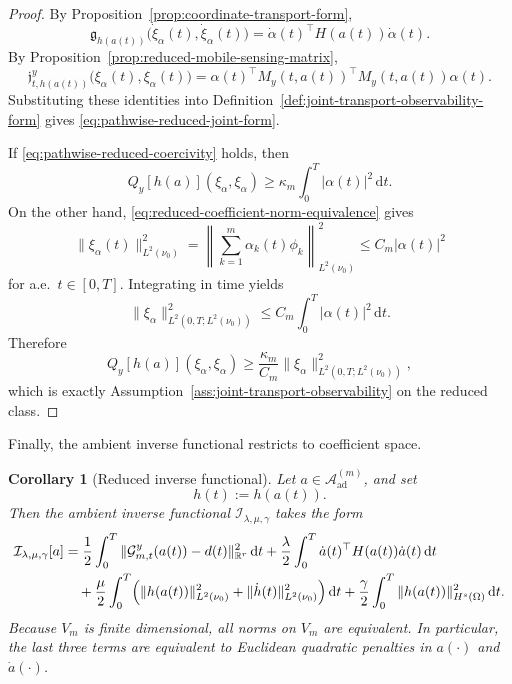 \documentclass{article}
\newtheorem{corollary}[theorem]{Corollary}
\theoremstyle{definition}
\renewcommand{\d}{\mathrm{d}}
\begin{document}
\begin{proof}
    By Proposition~\ref{prop:coordinate-transport-form},
    \[
        \mathfrak g_{h(a(t))}\bigl(\dot\xi_\alpha(t),\dot\xi_\alpha(t)\bigr)
        =
        \dot\alpha(t)^\top H(a(t))\dot\alpha(t).
    \]
    By Proposition~\ref{prop:reduced-mobile-sensing-matrix},
    \[
        \mathfrak j_{t,h(a(t))}^{y}\bigl(\xi_\alpha(t),\xi_\alpha(t)\bigr)
        =
        \alpha(t)^\top M_y(t,a(t))^\top M_y(t,a(t))\alpha(t).
    \]
    Substituting these identities into Definition~\ref{def:joint-transport-observability-form} gives
    \eqref{eq:pathwise-reduced-joint-form}.

    If \eqref{eq:pathwise-reduced-coercivity} holds, then
    \[
        Q_y[h(a)](\xi_\alpha,\xi_\alpha)
        \ge
        \kappa_m \int_0^T |\alpha(t)|^2\,\d t.
    \]
    On the other hand, \eqref{eq:reduced-coefficient-norm-equivalence} gives
    \[
        \|\xi_\alpha(t)\|_{L^2(\nu_0)}^2
        =
        \left\|\sum_{k=1}^m \alpha_k(t)\phi_k\right\|_{L^2(\nu_0)}^2
        \le
        C_m |\alpha(t)|^2
    \]
    for a.e.\ \(t\in[0,T]\). Integrating in time yields
    \[
        \|\xi_\alpha\|_{L^2(0,T;L^2(\nu_0))}^2
        \le
        C_m \int_0^T |\alpha(t)|^2\,\d t.
    \]
    Therefore
    \[
        Q_y[h(a)](\xi_\alpha,\xi_\alpha)
        \ge
        \frac{\kappa_m}{C_m}
        \|\xi_\alpha\|_{L^2(0,T;L^2(\nu_0))}^2,
    \]
    which is exactly Assumption~\ref{ass:joint-transport-observability} on the reduced class.
\end{proof}

Finally, the ambient inverse functional restricts to coefficient space.

\begin{corollary}[Reduced inverse functional]
    \label{cor:finite-dimensional-inverse-problem}
    Let \(a\in \mathcal A_{\mathrm{ad}}^{(m)}\), and set
    \[
        h(t):=h(a(t)).
    \]
    Then the ambient inverse functional \(\mathcal I_{\lambda,\mu,\gamma}\) takes the form
    \begin{align}
        \label{eq:reduced-inverse-functional}
        \mathcal I_{\lambda,\mu,\gamma}[a]
         & =
        \frac12\int_0^T \|\mathcal G_{m,t}^{y}(a(t))-d(t)\|_{\mathbb R^r}^2\,\d t
        +
        \frac{\lambda}{2}\int_0^T \dot a(t)^\top H(a(t))\dot a(t)\,\d t \notag \\
         & \quad
        +
        \frac{\mu}{2}\int_0^T
        \Bigl(
        \|h(a(t))\|_{L^2(\nu_0)}^2
        +
        \|\dot h(t)\|_{L^2(\nu_0)}^2
        \Bigr)\,\d t
        +
        \frac{\gamma}{2}\int_0^T \|h(a(t))\|_{H^s(\Omega)}^2\,\d t.
    \end{align}
    Because \(V_m\) is finite dimensional, all norms on \(V_m\) are equivalent. In particular, the
    last three terms are equivalent to Euclidean quadratic penalties in \(a(\cdot)\) and \(\dot a(\cdot)\).
\end{corollary}
\end{document}
